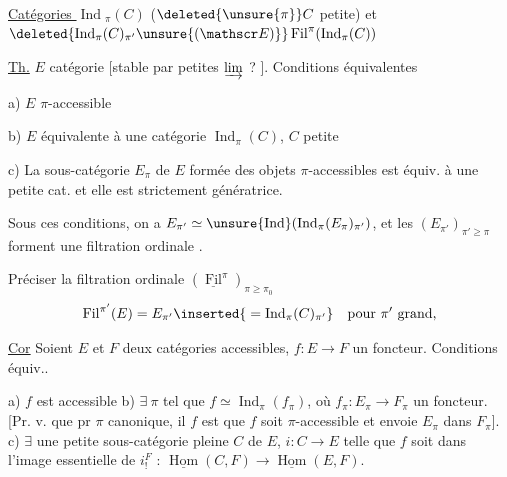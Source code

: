 
\uline{Catégories $\operatorname{Ind}$}$_\pi(C)$ ($\deleted{\unsure{\pi}} C$ petite) et $\deleted{\operatorname{Ind}_\pi(C)_{\pi'}\unsure{(\mathscr E)}}\operatorname{Fil}^{\pi}(\operatorname{Ind}_{\pi}(C))$

\uline{Th.} $E$ catégorie [stable par petites $\varinjlim$ ? ]. Conditions équivalentes

a) $E$ $\pi$-accessible

b) $E$ équivalente à une catégorie $\operatorname{Ind}_\pi(C)$, $C$ petite

c) La sous-catégorie $E_\pi$ de $E$ formée des objets $\pi$-accessibles est équiv. à une petite cat. et elle est strictement génératrice.


Sous ces conditions,  on a $E_{\pi'}\simeq\unsure{\operatorname{Ind}}(\operatorname{Ind}_{\pi}(E_\pi)_{\pi'})$, et les $(E_{\pi'})_{\pi'\geq\pi}$ forment une filtration ordinale
.

Préciser la filtration ordinale  $(\underline{\operatorname{Fil}}^{\pi})_{\pi\geq\pi_0}$ \unsure{---}
\[
 \operatorname{Fil}^{\pi'}(E)=E_{\pi'}\inserted{{}=\operatorname{Ind}_{\pi}(C)_{\pi'}}\quad\text{pour $\pi'$ grand,}
\]

\uline{Cor} Soient $E$ et $F$ deux catégories accessibles,   $f:E\to F$ un foncteur.  Conditions équiv..

a) $f$ est \deleted{$\pi$-}accessible  b) $\exists\ \pi$ tel que $f\simeq\operatorname{Ind}_\pi(f_\pi)$, où $f_\pi:E_\pi\to F_\pi$ un foncteur.  [Pr. v. que pr $\pi$ canonique, il $f$ est  que $f$ soit $\pi$-accessible et envoie $E_\pi$ dans $F_\pi$]. c) $\exists$ une petite sous-catégorie pleine $C$ de $E$, $i:C\to E$ telle que $f$ soit dans l'image essentielle de $i_!^F$ :
 $\underline{\operatorname{Hom}}(C,F)\to\underline{\operatorname{Hom}}(E,F)$.

